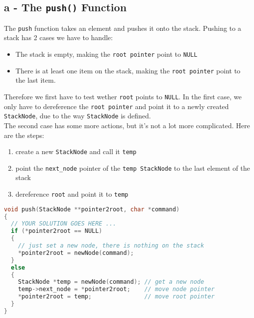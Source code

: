 \documentclass[a4paper, 11pt]{article}
\begin{document}
    \subsection{a - The \texttt{push()} Function}
    The \texttt{push} function takes an element and pushes it onto the stack.
    Pushing to a stack has 2 cases we have to handle:
    \begin{itemize}
        \item The stack is empty, making the \texttt{root pointer} point to \lstinline{NULL}
        \item There is at least one item on the stack, making the \texttt{root pointer} point to the last item.
    \end{itemize}
    Therefore we first have to test wether \texttt{root} points to \lstinline{NULL}. 
    In the first case, we only have to dereference the \texttt{root pointer} and point it to a newly created 
    \texttt{StackNode}, due to the way \texttt{StackNode} is defined.
    \\
    The second case has some more actions, but it's not a lot more complicated. Here are the steps:
    \begin{enumerate}
        \item create a new \texttt{StackNode} and call it \texttt{temp}
        \item point the \texttt{next\_node} pointer of the \texttt{temp StackNode} to the 
              last element of the stack
        \item dereference \texttt{root} and point it to \texttt{temp}
    \end{enumerate}
    \begin{lstlisting}[language=C,caption={The \texttt{push()} Function},label={push}]
void push(StackNode **pointer2root, char *command)
{
  // YOUR SOLUTION GOES HERE ...
  if (*pointer2root == NULL)
  {
    // just set a new node, there is nothing on the stack
    *pointer2root = newNode(command); 
  }
  else
  {
    StackNode *temp = newNode(command); // get a new node
    temp->next_node = *pointer2root;    // move node pointer
    *pointer2root = temp;               // move root pointer
  }
}
    \end{lstlisting}
    \newpage

\end{document}
